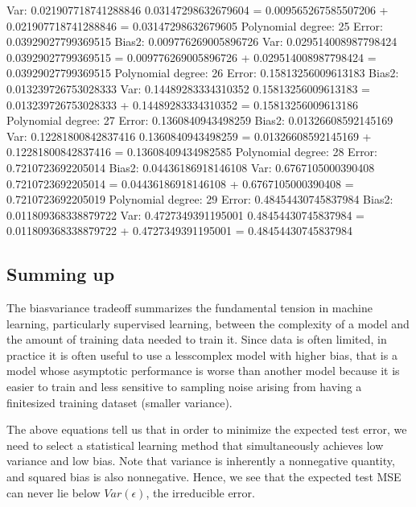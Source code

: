 \documentclass[letterpaper,10pt,english]{sphinxmanual}
\begin{document}
\begin{sphinxVerbatim}[commandchars=\\\{\}]
Var: 0.021907718741288846
0.03147298632679604 \PYGZgt{}= 0.009565267585507206 + 0.021907718741288846 = 0.03147298632679605
Polynomial degree: 25
Error: 0.03929027799369515
Bias\PYGZca{}2: 0.009776269005896726
Var: 0.029514008987798424
0.03929027799369515 \PYGZgt{}= 0.009776269005896726 + 0.029514008987798424 = 0.03929027799369515
Polynomial degree: 26
Error: 0.15813256009613183
Bias\PYGZca{}2: 0.013239726753028333
Var: 0.14489283334310352
0.15813256009613183 \PYGZgt{}= 0.013239726753028333 + 0.14489283334310352 = 0.15813256009613186
Polynomial degree: 27
Error: 0.1360840943498259
Bias\PYGZca{}2: 0.01326608592145169
Var: 0.12281800842837416
0.1360840943498259 \PYGZgt{}= 0.01326608592145169 + 0.12281800842837416 = 0.13608409434982585
Polynomial degree: 28
Error: 0.7210723692205014
Bias\PYGZca{}2: 0.04436186918146108
Var: 0.6767105000390408
0.7210723692205014 \PYGZgt{}= 0.04436186918146108 + 0.6767105000390408 = 0.7210723692205019
Polynomial degree: 29
Error: 0.48454430745837984
Bias\PYGZca{}2: 0.011809368338879722
Var: 0.4727349391195001
0.48454430745837984 \PYGZgt{}= 0.011809368338879722 + 0.4727349391195001 = 0.48454430745837984
\end{sphinxVerbatim}

\noindent{}




\subsection{Summing up}
\label{\detokenize{chapter4:summing-up}}
The bias\sphinxhyphen{}variance tradeoff summarizes the fundamental tension in
machine learning, particularly supervised learning, between the
complexity of a model and the amount of training data needed to train
it.  Since data is often limited, in practice it is often useful to
use a less\sphinxhyphen{}complex model with higher bias, that is  a model whose asymptotic
performance is worse than another model because it is easier to
train and less sensitive to sampling noise arising from having a
finite\sphinxhyphen{}sized training dataset (smaller variance).

The above equations tell us that in
order to minimize the expected test error, we need to select a
statistical learning method that simultaneously achieves low variance
and low bias. Note that variance is inherently a nonnegative quantity,
and squared bias is also nonnegative. Hence, we see that the expected
test MSE can never lie below \(Var(\epsilon)\), the irreducible error.
\end{document}
